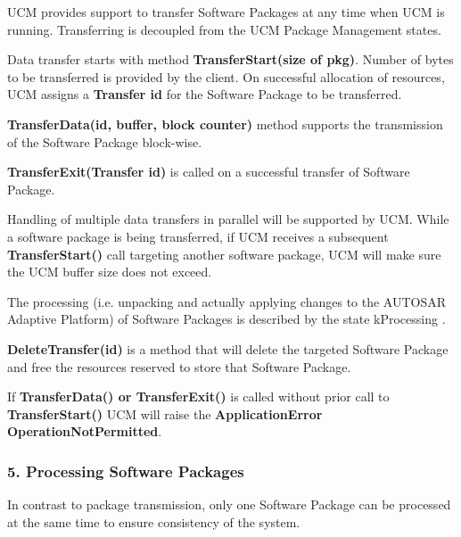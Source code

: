 \begin{DoxyItemize}
\item U\+CM provides support to transfer Software Packages at any time when U\+CM is running. Transferring is decoupled from the U\+CM Package Management states.
\item Data transfer starts with method {\bfseries Transfer\+Start(size of pkg)}. Number of bytes to be transferred is provided by the client. On successful allocation of resources, U\+CM assigns a {\bfseries Transfer id} for the Software Package to be transferred.
\item {\bfseries Transfer\+Data(id, buffer, block counter)} method supports the transmission of the Software Package block-\/wise.
\item {\bfseries Transfer\+Exit(\+Transfer id)} is called on a successful transfer of Software Package.
\item Handling of multiple data transfers in parallel will be supported by U\+CM. While a software package is being transferred, if U\+CM receives a subsequent {\bfseries Transfer\+Start()} call targeting another software package, U\+CM will make sure the U\+CM buffer size does not exceed.
\item The processing (i.\+e. unpacking and actually applying changes to the A\+U\+T\+O\+S\+AR Adaptive Platform) of Software Packages is described by the state k\+Processing .
\item {\bfseries Delete\+Transfer(id)} is a method that will delete the targeted Software Package and free the resources reserved to store that Software Package.
\item If {\bfseries Transfer\+Data() or Transfer\+Exit()} is called without prior call to {\bfseries Transfer\+Start()} U\+CM will raise the {\bfseries Application\+Error Operation\+Not\+Permitted}.
\end{DoxyItemize}

\subsubsection*{5. Processing Software Packages}

In contrast to package transmission, only one Software Package can be processed at the same time to ensure consistency of the system.


